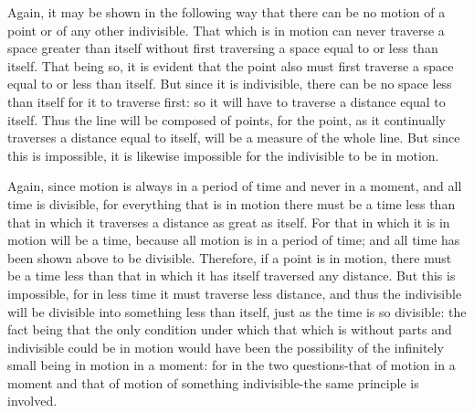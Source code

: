 Again, it may be shown in the following way that there can be no motion
of a point or of any other indivisible. That which is in motion can
never traverse a space greater than itself without first traversing
a space equal to or less than itself. That being so, it is evident
that the point also must first traverse a space equal to or less than
itself. But since it is indivisible, there can be no space less than
itself for it to traverse first: so it will have to traverse a distance
equal to itself. Thus the line will be composed of points, for the
point, as it continually traverses a distance equal to itself, will
be a measure of the whole line. But since this is impossible, it is
likewise impossible for the indivisible to be in motion.

Again, since motion is always in a period of time and never in a moment,
and all time is divisible, for everything that is in motion there
must be a time less than that in which it traverses a distance as
great as itself. For that in which it is in motion will be a time,
because all motion is in a period of time; and all time has been shown
above to be divisible. Therefore, if a point is in motion, there must
be a time less than that in which it has itself traversed any distance.
But this is impossible, for in less time it must traverse less distance,
and thus the indivisible will be divisible into something less than
itself, just as the time is so divisible: the fact being that the
only condition under which that which is without parts and indivisible
could be in motion would have been the possibility of the infinitely
small being in motion in a moment: for in the two questions-that of
motion in a moment and that of motion of something indivisible-the
same principle is involved. 

